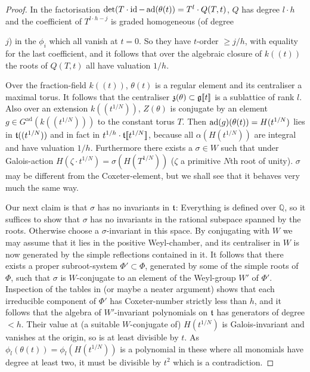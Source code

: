 \documentclass[12pt,english]{smfart}
\theoremstyle{plain} \newtheorem{innerthm}{Theorem} \newtheorem{innerlem}{Lemma} \newtheorem{innerprop}{Proposition} \newtheorem{innercor}{Corollary} \theoremstyle{definition} \newtheorem{innerdefn}{Definition} \newtheorem{innerconstr}{Construction} \theoremstyle{remark} \newtheorem*{remark}{Remark} \newtheorem*{remarks}{Remarks} \newtheorem*{applications}{Applications}
\begin{document}
\begin{proof}
In the factorisation $\det(T\cdot\operatorname{id}-\operatorname{ad}(\theta(t))=T^l\cdot Q(T,t)$, $Q$ has degree $l\cdot h$ and the coefficient of $T^{l\cdot h-j}$ is graded homogeneous (of degree


$j$) in the $\phi_i$ which all vanish at $t=0$. So they have $t$-order $\ge j/h$, with equality for the last coefficient, and it follows that over the algebraic closure of $k((t))$ the roots of $Q(T,t)$ all have valuation $1/h$.

Over the fraction-field $k((t))$, $\theta(t)$ is a regular element and its centraliser a maximal torus. It follows that the centraliser $\mathfrak{z}(\theta)\subset\mathfrak{g}[\![t]\!]$ is a sublattice of rank $l$. Also over an extension $k((t^{1/N}))$, $Z(\theta)$ is conjugate by an element $g\in G^{\mathrm{ad}}(k((t^{1/N})))$ to the constant torus $T$. Then $\operatorname{ad}(g)(\theta(t))=H(t^{1/N})$ lies in $\mathfrak{t}((t^{1/N}))$ and in fact in $t^{1/h}\cdot\mathfrak{t}[\![t^{1/N}]\!]$, because all $\alpha(H(t^{1/N}))$ are integral and have valuation $1/h$. Furthermore there exists a $\sigma\in W$ such that under Galois-action $H(\zeta\cdot t^{1/N})=\sigma(H(T^{1/N}))$ ($\zeta$ a primitive $N$th root of unity). $\sigma$ may be different from the Coxeter-element, but we shall see that it behaves very much the same way.

Our next claim is that $\sigma$ has no invariants in $\mathfrak{t}$: Everything is defined over $\mathbb{Q}$, so it suffices to show that $\sigma$ has no invariants in the rational subspace spanned by the roots. Otherwise choose a $\sigma$-invariant in this space. By conjugating with $W$ we may assume that it lies in the positive Weyl-chamber, and its centraliser in $W$ is now generated by the simple reflections contained in it. It follows that there exists a proper subroot-system $\Phi'\subset\Phi$, generated by some of the simple roots of $\Phi$, such that $\sigma$ is $W$-conjugate to an element of the Weyl-group $W'$ of $\Phi'$. Inspection of the tables in \cite{Bo} (or maybe a neater argument) shows that each irreducible component of $\Phi'$ has Coxeter-number strictly less than $h$, and it follows that the algebra of $W'$-invariant polynomials on $\mathfrak{t}$ has generators of degree $<h$. Their value at (a suitable $W$-conjugate of) $H(t^{1/N})$ is Galois-invariant and vanishes at the origin, so is at least divisible by $t$. As $\phi_l(\theta(t))=\phi_l(H(t^{1/N}))$ is a polynomial in these where all monomials have degree at least two, it must be divisible by $t^2$ which is a contradiction.


\end{proof}
\end{document}
